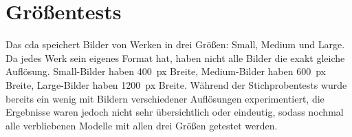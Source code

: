 %

\section{Größentests}
Das \gls{cda} speichert Bilder von Werken in drei Größen: Small, Medium und Large. Da jedes Werk sein eigenes Format hat, haben nicht alle Bilder die exakt gleiche Auflösung. Small-Bilder haben 400~px Breite, Medium-Bilder haben 600~px Breite, Large-Bilder haben 1200~px Breite. Während der Stichprobentests wurde bereits ein wenig mit Bildern verschiedener Auflösungen experimentiert, die Ergebnisse waren jedoch nicht sehr übersichtlich oder eindeutig, sodass nochmal alle verbliebenen Modelle mit allen drei Größen getestet werden.

